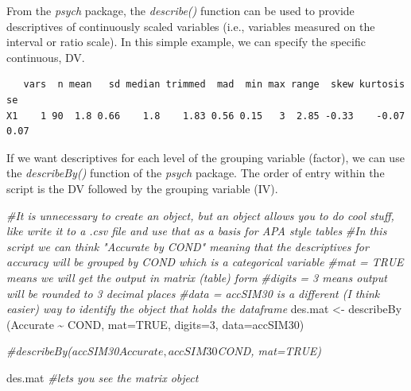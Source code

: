 \documentclass[
  english,
]{book}
\newenvironment{Shaded}{\begin{snugshade}}{\end{snugshade}}
\newcommand{\AttributeTok}[1]{\textcolor[rgb]{0.77,0.63,0.00}{#1}}
\newcommand{\CommentTok}[1]{\textcolor[rgb]{0.56,0.35,0.01}{\textit{#1}}}
\newcommand{\ConstantTok}[1]{\textcolor[rgb]{0.00,0.00,0.00}{#1}}
\newcommand{\DecValTok}[1]{\textcolor[rgb]{0.00,0.00,0.81}{#1}}
\newcommand{\FunctionTok}[1]{\textcolor[rgb]{0.00,0.00,0.00}{#1}}
\newcommand{\NormalTok}[1]{#1}
\newcommand{\OtherTok}[1]{\textcolor[rgb]{0.56,0.35,0.01}{#1}}
\newcommand{\SpecialCharTok}[1]{\textcolor[rgb]{0.00,0.00,0.00}{#1}}
\begin{document}
From the \emph{psych} package, the \emph{describe()} function can be used to provide descriptives of continuously scaled variables (i.e., variables measured on the interval or ratio scale). In this simple example, we can specify the specific continuous, DV.

\begin{Shaded}
\end{Shaded}

\begin{verbatim}
   vars  n mean   sd median trimmed  mad  min max range  skew kurtosis   se
X1    1 90  1.8 0.66    1.8    1.83 0.56 0.15   3  2.85 -0.33    -0.07 0.07
\end{verbatim}

If we want descriptives for each level of the grouping variable (factor), we can use the \emph{describeBy()} function of the \emph{psych} package. The order of entry within the script is the DV followed by the grouping variable (IV).

\begin{Shaded}
\begin{Highlighting}[]
\CommentTok{\#It is unnecessary to create an object, but an object allows you to do cool stuff, like write it to a .csv file and use that as a basis for APA style tables}
\CommentTok{\#In this script we can think "Accurate by COND" meaning that the descriptives for accuracy will be grouped by COND which is a categorical variable}
\CommentTok{\#mat = TRUE means we will get the output in matrix (table) form}
\CommentTok{\#digits = 3 means output will be rounded to 3 decimal places}
\CommentTok{\#data = accSIM30 is a different (I think easier) way to identify the object that holds the dataframe}
\NormalTok{des.mat }\OtherTok{\textless{}{-}} \FunctionTok{describeBy}\NormalTok{ (Accurate }\SpecialCharTok{\textasciitilde{}}\NormalTok{ COND, }\AttributeTok{mat=}\ConstantTok{TRUE}\NormalTok{, }\AttributeTok{digits=}\DecValTok{3}\NormalTok{, }\AttributeTok{data=}\NormalTok{accSIM30) }

\CommentTok{\#describeBy(accSIM30$Accurate, accSIM30$COND, mat=TRUE)}

\NormalTok{des.mat }\CommentTok{\#let\textquotesingle{}s you see the matrix object}
\end{Highlighting}
\end{Shaded}
\end{document}
